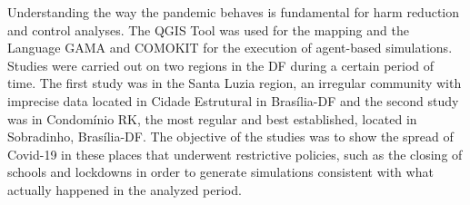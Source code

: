 Understanding the way the pandemic behaves is fundamental for harm reduction and control analyses. The QGIS Tool was used for the mapping and the Language GAMA and COMOKIT for the execution of agent-based simulations. Studies were carried out on two regions in the DF during a certain period of time. The first study was in the Santa Luzia region, an irregular community with imprecise data located in Cidade Estrutural in Brasília-DF and the second study was in Condomínio RK, the most regular and best established, located in Sobradinho, Brasília-DF. The objective of the studies was to show the spread of Covid-19 in these places that underwent restrictive policies, such as the closing of schools and lockdowns in order to generate simulations consistent with what actually happened in the analyzed period.